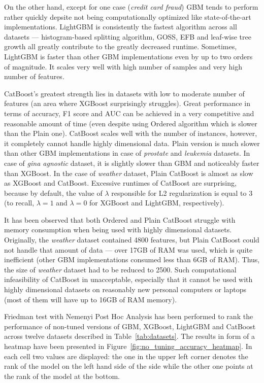 \documentclass[magisterska, english]{pwr_wmat_praca_dyplomowa}
\theoremstyle{plain}
\numberwithin{theorem}{chapter}
\theoremstyle{definition}
\numberwithin{theorem}{chapter}
\newcommand{\gbm}{GBM, XGBoost, LightGBM and CatBoost }
\begin{document}
On the other hand, except for one case (\emph{credit card fraud}) GBM tends to perform rather quickly depsite not being computationally optimized like state-of-the-art implementations. LightGBM is consistently the fastest algorithm across all datasets --- histogram-based splitting algorithm, GOSS, EFB and leaf-wise tree growth all greatly contribute to the greatly decreased runtime. Sometimes, LightGBM is faster than other GBM implementations even by up to two orders of magnitude. It scales very well with high number of samples and very high number of features. 

CatBoost's greatest strength lies in datasets with low to moderate number of features (an area where XGBoost surprisingly struggles). Great performance in terms of accuracy, F1 score and AUC can be achieved in a very competitive and reasonable amount of time (even despite using Ordered algorithm which is slower than the Plain one). CatBoost scales well with the number of instances, however, it completely cannot handle highly dimensional data. Plain version is much slower than other GBM implementations in case of \emph{prostate} and \emph{leukemia} datasets. In case of \emph{gina agnostic} dataset, it is slightly slower than GBM and noticeably faster than XGBoost. In the case of \emph{weather} dataset, Plain CatBoost is almost as slow as XGBoost and CatBoost. Excessive runtimes of CatBoost are surprising, because by default, the value of $\lambda$ responsible for L2 regularization is equal to 3 (to recall, $\lambda=1$ and $\lambda=0$ for XGBoost and LightGBM, respectively).

It has been observed that both Ordered and Plain CatBoost struggle with memory consumption when being used with highly dimensional datasets. Originally, the \emph{weather} dataset contained 4800 features, but Plain CatBoost could not handle that amount of data --- over 17GB of RAM was used, which is quite inefficient (other GBM implementations consumed less than 6GB of RAM). Thus, the size of \emph{weather} dataset had to be reduced to 2500. Such computational infeasibility of CatBoost in unacceptable, especially that it cannot be used with highly dimensional datasets on reasonably new personal computers or laptops (most of them will have up to 16GB of RAM memory). 

Friedman test with Nemenyi Post Hoc Analysis has been performed to rank the performance of non-tuned versions of \gbm across twelve datasets described in Table~\ref{tab:datasets}. The results in form of a heatmap have been presented in Figure~\ref{fig:no_tuning_accuracy_heatmap}. In each cell two values are displayed: the one in the upper left corner denotes the rank of the model on the left hand side of the side while the other one points at the rank of the model at the bottom.
\end{document}
